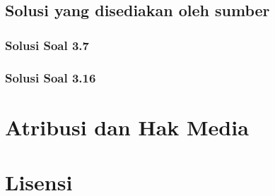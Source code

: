 \documentclass[11pt,a4paper,oneside]{book}
\begin{document}
\section*{Solusi yang disediakan oleh sumber}
\subsection*{Solusi Soal 3.7}

\subsection*{Solusi Soal 3.16}


\backmatter
\listoffigures
\chapter*{Atribusi dan Hak Media}



\chapter*{Lisensi}
\Lizenztext
\end{document}
